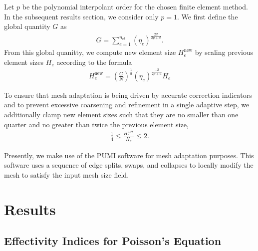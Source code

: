 Let $p$ be the polynomial interpolant order for the chosen finite element
method. In the subsequent results section, we consider only $p=1$. We first
define the global quantity $G$ as
%
\begin{gather}
G = \sum_{e=1}^{n_{el}} ( \eta_e ) ^{\frac{2d}{2p+d}}.
\label{eq:refine_global_size}
\end{gather}
%
From this global quanitty, we compute new element size $H_e^{\text{new}}$
by scaling previous element sizes $H_e$ according to the formula
%
\begin{gather}
H_e^{\text{new}} = \left( \frac{G}{N} \right)^{\frac{1}{d}}
( \eta_e )^{\frac{-2}{2p + d}} H_e
\label{eq:refine_size_field}
\end{gather}

To ensure that mesh adaptation is being driven by accurate correction indicators
and to prevent excessive coarsening and refinement in a single adaptive step,
we additionally clamp new element sizes such that they are no smaller than one
quarter and no greater than twice the previous element size,
%
\begin{gather}
\frac14 \leq \frac{H_e^{\text{new}}}{H_e} \leq 2.
\label{eq:refine_size_clamping}
\end{gather}

Presently, we make use of the PUMI \cite{ibanez2016pumi} software
for mesh adaptation purposes. This software uses a sequence of edge splits,
swaps, and collapses \cite{li20053d, alauzet2006parallel} to locally modify
the mesh to satisfy the input mesh size field.

\section{Results}

\subsection{Effectivity Indices for Poisson's Equation}


